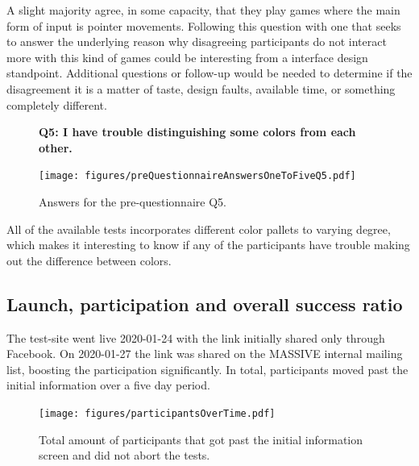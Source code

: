\documentclass[nofilelist,dvipsnames]{cslthse-msc}
\begin{document}
        A slight majority agree, in some capacity, that they play games where
        the main form of input is pointer movements. Following this question
        with one that seeks to answer the underlying reason why disagreeing
        participants do not interact more with this kind of games could be
        interesting from a interface design standpoint. Additional questions or
        follow-up would be needed to determine if the disagreement it is a
        matter of taste, design faults, available time, or something completely
        different.

				\begin{figure}[h!]
          \textbf{Q5: I have trouble distinguishing some colors from each other.}
          \begin{center}
            \texttt{[image: figures/preQuestionnaireAnswersOneToFiveQ5.pdf]}
            \vspace{-1cm}
            \caption{Answers for the pre-questionnaire Q5.}
            \vspace{-0.4cm}
          \end{center}
				\end{figure}

        All of the available tests incorporates different color pallets to
        varying degree, which makes it interesting to know if any of the
        participants have trouble making out the difference between colors.
        \vspace{-0.6cm}

			\subsection{Launch, participation and overall success ratio}

        The test-site went live 2020-01-24 with the link initially shared only
        through Facebook. On 2020-01-27 the link was shared on the MASSIVE
        internal mailing list, boosting the participation significantly.
        In total,  participants moved past the
        initial information over a five day period.

        \vspace{-0.55cm}
				\begin{figure}[h!]
					\centering
					\texttt{[image: figures/participantsOverTime.pdf]}
          \vspace{-0.3cm}
          \caption{
            Total amount of participants that got past the initial
            information screen and did not abort the tests.
          }
				\end{figure}
\end{document}
